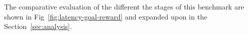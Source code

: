 The comparative evaluation of the different the stages of this benchmark are shown in Fig~\ref{fig:latency-goal-reward} and expanded upon in the Section~\ref{sec:analysis}.

%
%        

